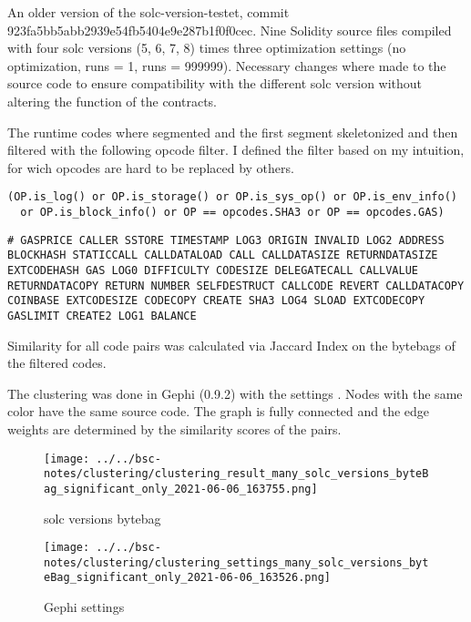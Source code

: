 \documentclass[../main.tex]{subfiles}
\begin{document}
An older version of the solc-version-testet\cite{solc-versions-testset}, commit 923fa5bb5abb2939e54fb5404e9e287b1f0f0cec.
Nine Solidity source files compiled with four solc versions (5, 6, 7, 8) times three optimization
settings (no optimization, runs = 1, runs = 999999).
Necessary changes where made to the source code to ensure compatibility with the different solc
version without altering the function of the contracts.

The runtime codes where segmented and the first segment skeletonized and then filtered with the following opcode filter. I defined the filter based on my intuition, for wich opcodes are hard to be replaced by others.
\begin{lstlisting}[style=pymd]
(OP.is_log() or OP.is_storage() or OP.is_sys_op() or OP.is_env_info()
  or OP.is_block_info() or OP == opcodes.SHA3 or OP == opcodes.GAS)
\end{lstlisting}
\begin{lstlisting}[style=pysm]
# GASPRICE CALLER SSTORE TIMESTAMP LOG3 ORIGIN INVALID LOG2 ADDRESS BLOCKHASH STATICCALL CALLDATALOAD CALL CALLDATASIZE RETURNDATASIZE EXTCODEHASH GAS LOG0 DIFFICULTY CODESIZE DELEGATECALL CALLVALUE RETURNDATACOPY RETURN NUMBER SELFDESTRUCT CALLCODE REVERT CALLDATACOPY COINBASE EXTCODESIZE CODECOPY CREATE SHA3 LOG4 SLOAD EXTCODECOPY GASLIMIT CREATE2 LOG1 BALANCE
\end{lstlisting}

Similarity for all code pairs was calculated via Jaccard Index on the bytebags of the filtered codes.

The clustering  was done in Gephi (0.9.2) with the settings .
Nodes with the same color have the same source code.
The graph is fully connected and the edge weights are determined by the similarity scores of the pairs.

\begin{figure*}[ht!]
  \texttt{[image: ../../bsc-notes/clustering/clustering\_result\_many\_solc\_versions\_byteBag\_significant\_only\_2021-06-06\_163755.png]}
  \caption{solc versions bytebag}
  \label{fig:solc_bytebag_cluster}
\end{figure*}

\begin{figure*}[ht!]
  \centering
  \texttt{[image: ../../bsc-notes/clustering/clustering\_settings\_many\_solc\_versions\_byteBag\_significant\_only\_2021-06-06\_163526.png]}
  \caption{Gephi settings}
  \label{fig:solc_bytebag_cluster_settings}
\end{figure*}
\end{document}
